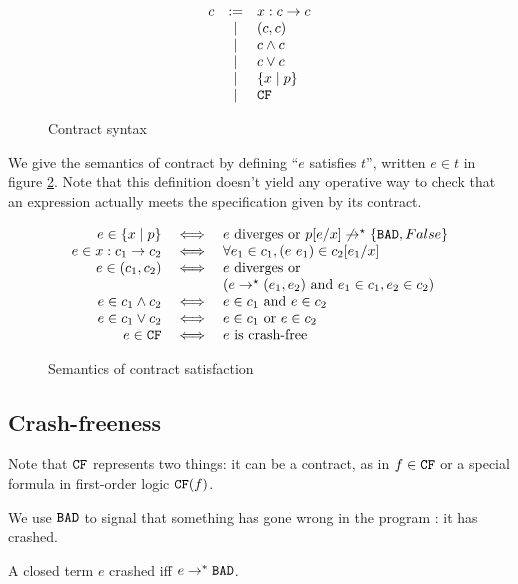 \documentclass[preprint]{sigplanconf}
\begin{document}
\begin{figure}[h]
 \centering 
  \[  \begin{array}{rclr}
  c &:=& x:c \to c\\
  &\mid& (c,c) \\
  &\mid& c \land c \\
  &\mid& c \lor c \\
  &\mid& \{ x \mid p \}\\
  &\mid& \texttt{CF} \\
  \end{array} \]
  \caption{Contract syntax}
  \label{cont-stx}
\end{figure}

We give the semantics of contract by defining ``$e$ satisfies $t$'',
written $e \in t$ in figure \ref{cont-smt}. Note that this definition
doesn't yield any operative way to check that an expression actually
meets the specification given by its contract.

\begin{figure}[h]
 \centering
  \[  \begin{array}{rcl}
    e \in \{x \mid p \} &\iff& e \mbox{ diverges or } p[e/x] \not \to^\star \{\texttt{BAD},False\}\\
    e \in x:c_1 \to c_2 &\iff& \forall e_1 \in c_1, (e~e_1) \in c_2[e_1/x]\\
    e \in (c_1,c_2) &\iff& e \mbox{ diverges or }\\
    &&  (e \to^\star (e_1,e_2) \mbox{ and } e_1 \in c_1, e_2 \in c_2)\\
    e \in c_1 \land c_2 &\iff& e \in c_1 \mbox{ and } e \in c_2 \\
    e \in c_1 \lor c_2 &\iff& e \in c_1 \mbox{ or } e \in c_2 \\
    e \in \texttt{CF} &\iff& e \mbox{ is crash-free}
  \end{array} \]
  \caption{Semantics of contract satisfaction}
  \label{cont-smt}
\end{figure}

\subsection{Crash-freeness}\label{sec:cf}
Note that $\texttt{CF}$ represents two things: it can be a contract, as in $f
\in \texttt{CF}$ or a special formula in first-order logic $\texttt{CF}(f)$.

We use $\texttt{BAD}$ to signal that something has gone wrong in the program :
it has crashed.

\begin{definition}[Crash]
A closed term $e$ crashed iff $e \to^* \texttt{BAD}$.
\end{definition}
\end{document}
